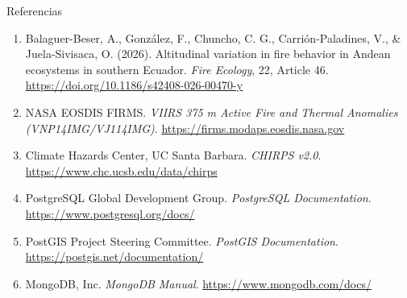 \documentclass[aspectratio=169,11pt]{beamer}
\begin{document}
\begin{frame}{Referencias}
  \footnotesize
  \begin{enumerate}
    \item Balaguer-Beser, A., Gonz\'alez, F., Chuncho, C. G., Carri\'on-Paladines, V., \& Juela-Sivisaca, O. (2026). Altitudinal variation in fire behavior in Andean ecosystems in southern Ecuador. \textit{Fire Ecology}, 22, Article 46. \url{https://doi.org/10.1186/s42408-026-00470-y}
    \item NASA EOSDIS FIRMS. \textit{VIIRS 375 m Active Fire and Thermal Anomalies (VNP14IMG/VJ114IMG)}. \url{https://firms.modaps.eosdis.nasa.gov}
    \item Climate Hazards Center, UC Santa Barbara. \textit{CHIRPS v2.0}. \url{https://www.chc.ucsb.edu/data/chirps}
    \item PostgreSQL Global Development Group. \textit{PostgreSQL Documentation}. \url{https://www.postgresql.org/docs/}
    \item PostGIS Project Steering Committee. \textit{PostGIS Documentation}. \url{https://postgis.net/documentation/}
    \item MongoDB, Inc. \textit{MongoDB Manual}. \url{https://www.mongodb.com/docs/}
  \end{enumerate}
\end{frame}
\end{document}
